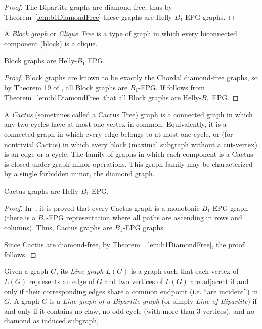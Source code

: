 \documentclass{dmgt}
\begin{document}
\begin{proof}
The Bipartite graphs are diamond-free, thus by Theorem~\ref{lem:b1DiamondFree} these graphs are Helly-$B_1$-EPG graphs.
\end{proof}

A \textit{Block graph} or \textit{Clique Tree} is a type of graph in which every biconnected component (block) is a clique.

\begin{cor}\label{lem:cdf}
 Block graphs are Helly-$B_1$ EPG.
\end{cor}

\begin{proof}
Block graphs are known to be exactly the Chordal diamond-free graphs, so by   Theorem 19 of \cite{ries2009}, all Block graphs are  $B_1$-EPG. If follows from Theorem~\ref{lem:b1DiamondFree} that all Block graphs are Helly-$B_1$ EPG. 
 \end{proof} 

A \textit{Cactus} (sometimes called a Cactus Tree)  graph is a connected graph in which any two  cycles have at most one vertex in common. Equivalently, it is a connected graph in which every edge belongs to at most one  cycle, or (for nontrivial Cactus) in which every block (maximal subgraph without a cut-vertex) is an edge or a cycle. The family of graphs in which each component is a Cactus is closed under graph minor operations. This graph family may be characterized by a single forbidden minor, the diamond graph.
 
\begin{cor}
Cactus graphs are  Helly-$B_1$ EPG.
\end{cor}
\begin{proof}
In~\cite{cela2019monotonic}, it is proved that every Cactus graph is a monotonic $B_1$-EPG graph 
(there is a $B_1$-EPG representation where all paths are ascending in rows and columns). 
Thus, Cactus graphs are $B_1$-EPG graphs. 

Since Cactus are diamond-free, by Theorem ~\ref{lem:b1DiamondFree}, the proof follows.
\end{proof}

Given a graph $G$, its \textit{Line graph} $L(G)$ is a graph such that each vertex of $L(G)$ represents an edge of $G$ and
  two vertices of $L(G)$ are adjacent if and only if their corresponding edges share a common endpoint (i.e. ``are incident'') in $G$.  
A graph $G$ is a \textit{Line graph of a Bipartite graph} (or simply \textit{Line of Bipartite}) if and only if it
contains no claw, no odd cycle (with more than 3 vertices), and no diamond as induced subgraph, \cite{harary1974line}.
\end{document}
